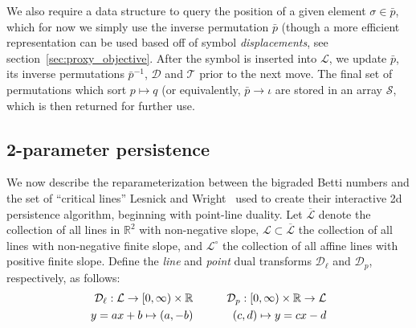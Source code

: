 \documentclass[sn-mathphys]{sn-jnl}
\begin{document}
We also require a data structure to query the position of a given element $\sigma \in \bar{p}$, which for now we simply use the inverse permutation $\bar{p}$ (though a more efficient representation can be used based off of symbol \emph{displacements}, see section~\ref{sec:proxy_objective}.
After the symbol is inserted into $\mathcal{L}$, we update $\bar{p}$, its inverse permutations $\bar{p}^{-1}$, $\mathcal{D}$ and $\mathcal{T}$ prior to the next move. The final set of permutations which sort $p \mapsto q$ (or equivalently, $\bar{p} \to \iota$ are stored in an array $\mathcal{S}$, which is then returned for further use. 

\subsection{2-parameter persistence}\label{app:2d_pers}\label{sec:fibered_barcode_reparam}
We now describe the reparameterization between the bigraded Betti numbers and the set of ``critical lines'' Lesnick and Wright~\cite{lesnick2012multidimensional} used to create their interactive 2d persistence algorithm, beginning with point-line duality.
Let $\overline{\mathcal{L}}$ denote the collection of all lines in $\mathbb{R}^2$ with non-negative slope, $\mathcal{L} \subset \overline{\mathcal{L}}$ the collection of all lines with non-negative finite slope, and $\mathcal{L}^\circ$ the collection of all affine lines with positive finite slope. 
Define the \emph{line} and \emph{point} dual transforms $\mathcal{D}_{\ell}$ and $\mathcal{D}_p$, respectively, as follows: 
\begin{equation}
	\begin{aligned}
\mathcal{D}_{\ell}: \mathcal{L} \rightarrow[0, \infty) \times \mathbb{R} & \quad \hfill \quad & \mathcal{D}_{p}:[0, \infty) \times \mathbb{R} \rightarrow \mathcal{L} \\
y=a x+b \mapsto(a,-b) &\quad \hfill \quad & (c, d) \mapsto y=c x-d
\end{aligned}
\end{equation}
\end{document}
